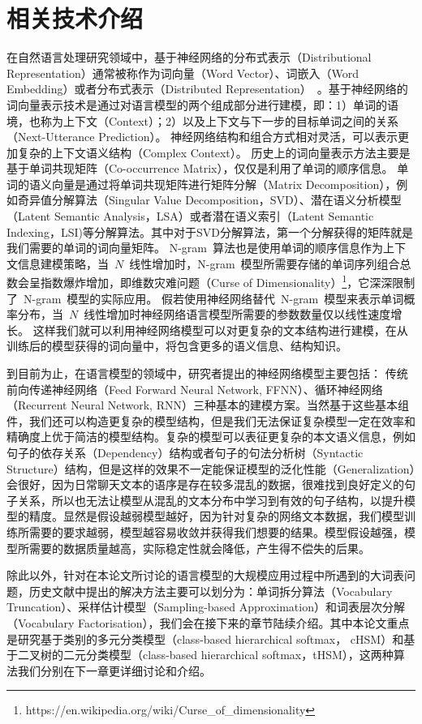\chapter{相关技术介绍}
在自然语言处理研究领域中，基于神经网络的分布式表示（Distributional Representation）通常被称作为词向量（Word Vector）、词嵌入（Word Embedding）或者分布式表示（Distributed Representation）~。基于神经网络的词向量表示技术是通过对语言模型的两个组成部分进行建模，即：1）单词的语境，也称为上下文（Context）；2）以及上下文与下一步的目标单词之间的关系（Next-Utterance Prediction）。
神经网络结构和组合方式相对灵活，可以表示更加复杂的上下文语义结构（Complex Context）。
历史上的词向量表示方法主要是基于单词共现矩阵（Co-occurrence Matrix），仅仅是利用了单词的顺序信息。
单词的语义向量是通过将单词共现矩阵进行矩阵分解（Matrix Decomposition），例如奇异值分解算法（Singular Value Decomposition，SVD）、潜在语义分析模型（Latent Semantic Analysis，LSA）或者潜在语义索引（Latent Semantic Indexing，LSI)等分解算法。其中对于SVD分解算法，第一个分解获得的矩阵就是我们需要的单词的词向量矩阵。
N-gram~算法也是使用单词的顺序信息作为上下文信息建模策略，当~$N$~线性增加时，N-gram~模型所需要存储的单词序列组合总数会呈指数爆炸增加，即维数灾难问题（Curse of Dimensionality）\footnote{https://en.wikipedia.org/wiki/Curse\_of\_dimensionality}，它深深限制了~N-gram~模型的实际应用。
假若使用神经网络替代~N-gram~模型来表示单词概率分布，当~$N$~线性增加时神经网络语言模型所需要的参数数量仅以线性速度增长。
这样我们就可以利用神经网络模型可以对更复杂的文本结构进行建模，在从训练后的模型获得的词向量中，将包含更多的语义信息、结构知识。

到目前为止，在语言模型的领域中，研究者提出的神经网络模型主要包括： 传统前向传递神经网络（Feed Forward Neural Network, FFNN）、循环神经网络（Recurrent Neural Network, RNN）三种基本的建模方案。当然基于这些基本组件，我们还可以构造更复杂的模型结构，但是我们无法保证复杂模型一定在效率和精确度上优于简洁的模型结构。复杂的模型可以表征更复杂的本文语义信息，例如句子的依存关系（Dependency）结构或者句子的句法分析树（Syntactic Structure）结构，但是这样的效果不一定能保证模型的泛化性能（Generalization）会很好，因为日常聊天文本的语序是存在较多混乱的数据，很难找到良好定义的句子关系，所以也无法让模型从混乱的文本分布中学习到有效的句子结构，以提升模型的精度。显然是假设越弱模型越好，因为针对复杂的网络文本数据，我们模型训练所需要的要求越弱，模型越容易收敛并获得我们想要的结果。模型假设越强，模型所需要的数据质量越高，实际稳定性就会降低，产生得不偿失的后果。


除此以外，针对在本论文所讨论的语言模型的大规模应用过程中所遇到的大词表问题，历史文献中提出的解决方法主要可以划分为：单词拆分算法（Vocabulary Truncation）、采样估计模型（Sampling-based Approximation）和词表层次分解（Vocabulary Factorisation），我们会在接下来的章节陆续介绍。其中本论文重点是研究基于类别的多元分类模型（class-based hierarchical softmax， cHSM）和基于二叉树的二元分类模型（class-based hierarchical softmax，tHSM），这两种算法我们分别在下一章更详细讨论和介绍。

